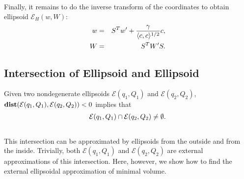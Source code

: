 \documentclass[letterpaper,10pt,english]{sphinxmanual}
\begin{document}
Finally, it remains to do the inverse transform of the coordinates to
obtain ellipsoid ${\mathcal E}_H(w,W)$:
\begin{gather}
\begin{split}\begin{aligned}
w & = & S^Tw' + \frac{\gamma}{\langle c,c\rangle^{1/2}}c, \\
W & = & S^TW'S.\end{aligned}\end{split}\notag
\end{gather}

\subsection{Intersection of Ellipsoid and Ellipsoid}
\label{chap_ellcalc:intersection-of-ellipsoid-and-ellipsoid}
Given two nondegenerate ellipsoids ${\mathcal E}(q_1,Q_1)$ and
${\mathcal E}(q_2,Q_2)$,
${\bf dist}({\mathcal E}(q_1,Q_1),{\mathcal E}(q_2,Q_2))<0$
implies that
\begin{gather}
\begin{split}{\mathcal E}(q_1,Q_1)\cap{\mathcal E}(q_2,Q_2)\neq\emptyset .\end{split}\notag\\\begin{split}\end{split}\notag
\end{gather}
This intersection can be approximated by ellipsoids from the outside
and from the inside. Trivially, both ${\mathcal E}(q_1,Q_1)$ and
${\mathcal E}(q_2,Q_2)$ are external approximations of this
intersection. Here, however, we show how to find the external
ellipsoidal approximation of minimal volume.
\end{document}
